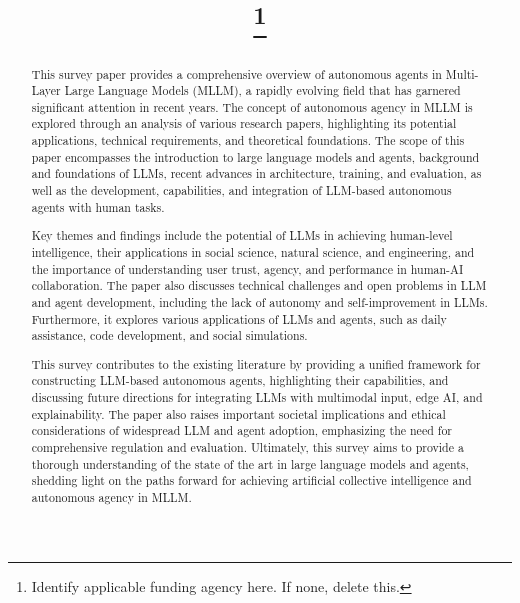 \documentclass[conference]{IEEEtran}
\begin{document}
\title{
\thanks{Identify applicable funding agency here. If none, delete this.}
}

\author{
\and
{}
}

\maketitle

\begin{abstract}
This survey paper provides a comprehensive overview of autonomous agents in Multi-Layer Large Language Models (MLLM), a rapidly evolving field that has garnered significant attention in recent years. The concept of autonomous agency in MLLM is explored through an analysis of various research papers, highlighting its potential applications, technical requirements, and theoretical foundations. The scope of this paper encompasses the introduction to large language models and agents, background and foundations of LLMs, recent advances in architecture, training, and evaluation, as well as the development, capabilities, and integration of LLM-based autonomous agents with human tasks.

Key themes and findings include the potential of LLMs in achieving human-level intelligence, their applications in social science, natural science, and engineering, and the importance of understanding user trust, agency, and performance in human-AI collaboration. The paper also discusses technical challenges and open problems in LLM and agent development, including the lack of autonomy and self-improvement in LLMs. Furthermore, it explores various applications of LLMs and agents, such as daily assistance, code development, and social simulations.

This survey contributes to the existing literature by providing a unified framework for constructing LLM-based autonomous agents, highlighting their capabilities, and discussing future directions for integrating LLMs with multimodal input, edge AI, and explainability. The paper also raises important societal implications and ethical considerations of widespread LLM and agent adoption, emphasizing the need for comprehensive regulation and evaluation. Ultimately, this survey aims to provide a thorough understanding of the state of the art in large language models and agents, shedding light on the paths forward for achieving artificial collective intelligence and autonomous agency in MLLM.
\end{abstract}
\end{document}
